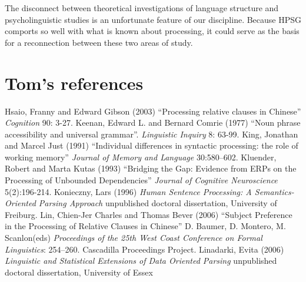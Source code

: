 \documentclass[a4paper]{article}
\begin{document}
The disconnect between theoretical investigations of language structure and psycholinguistic studies is an unfortunate feature of our discipline.  Because HPSG comports so well with what is known about processing, it could serve as the basis for a reconnection between these two areas of study.

{\sloppy
\printbibliography[heading=subbibliography,notkeyword=this] 
}

\section*{Tom's references}
Hsaio, Franny and Edward Gibson (2003) ``Processing relative clauses in Chinese'' {\it Cognition} 90: 3-27.
\newline
\newline
Keenan, Edward L. and Bernard Comrie (1977) ``Noun phrase accessibility and universal grammar''. {\it Linguistic Inquiry} 8: 63-99.
\newline
\newline
King, Jonathan and Marcel Just  (1991) ``Individual differences in syntactic processing: the role of working memory'' {\it Journal of Memory and Language} 30:580–602.
\newline
\newline
Kluender, Robert and Marta Kutas (1993) ``Bridging the Gap: Evidence from ERPs on the Processing of Unbounded Dependencies'' {\it Journal of Cognitive Neuroscience} 5(2):196-214.
\newline
\newline
Konieczny, Lars (1996) {\it Human Sentence Processing:
A Semantics-Oriented Parsing Approach} unpublished doctoral dissertation, University of Freiburg.
\newline
\newline
Lin, Chien-Jer Charles  and Thomas Bever (2006) ``Subject Preference in the Processing of Relative Clauses in Chinese'' D. Baumer, D. Montero, M. Scanlon(eds) {\it Proceedings of the 25th West Coast Conference on Formal Linguistics}: 254–260. Cascadilla Proceedings Project.
\newline
\newline
Linadarki, Evita (2006) {\it Linguistic and Statistical Extensions of Data
Oriented Parsing} unpublished doctoral dissertation, University of Essex
\newline
\end{document}
